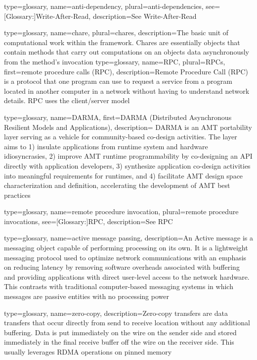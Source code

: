 {
  type=glossary,
  name={anti-dependency},
  plural={anti-dependencies},
  see={[Glossary:]{Write-After-Read}},
  description={See \gls{Write-After-Read}}
}

{
  type=glossary,
  name={chare},
  plural={chares},
  description={The basic unit of computational work within the \Charm{} framework. Chares are essentially \protect\CC{} objects that contain methods that carry out computations on an objects data asynchronously from the method's invocation}
}
{
  type=glossary,
  name={RPC},
  plural={RPCs},
  first={remote procedure calls (RPC)},
  description={Remote Procedure Call (RPC) is a protocol that one
  program can use to request a service from a program located in
  another computer in a network without having to understand network
  details. RPC uses the client/server model}
}

{
  type=glossary,
  name={DARMA},
  first={DARMA (Distributed Asynchronous Resilient Models and Applications)},
  description={ DARMA is an AMT portability layer serving as a vehicle for
    community-based co-design activities.  The layer aims to 1) insulate applications from runtime system and hardware idiosyncrasies,
2) improve AMT runtime programmability by co-designing an API directly with
  application developers, 3) synthesize application co-design activities into
  meaningful requirements for runtimes, and 4) 
facilitate AMT design space characterization and definition, accelerating the development of AMT best practices}
}

{
  type=glossary,
  name={remote procedure invocation},
  plural={remote procedure invocations},
  see={[Glossary:]{RPC}},
  description={See RPC}
}

{
  type=glossary,
  name={active message passing},
  description={An Active message is a messaging object
  capable of performing processing on its own. It is a lightweight
  messaging protocol used to optimize network communications with an
  emphasis on reducing latency by removing software overheads
  associated with buffering and providing applications with direct
  user-level access to the network hardware. This contrasts with
  traditional computer-based messaging systems in which messages are
  passive entities with no processing power}
}

{
  type={glossary},
  name={zero-copy},
  description={Zero-copy transfers are data transfers that occur directly from send to receive location without any additional buffering. Data is put immediately on the wire on the sender side and stored immediately in the final receive buffer off the wire on the receiver side. This usually leverages \gls{RDMA} operations on pinned memory}
}

